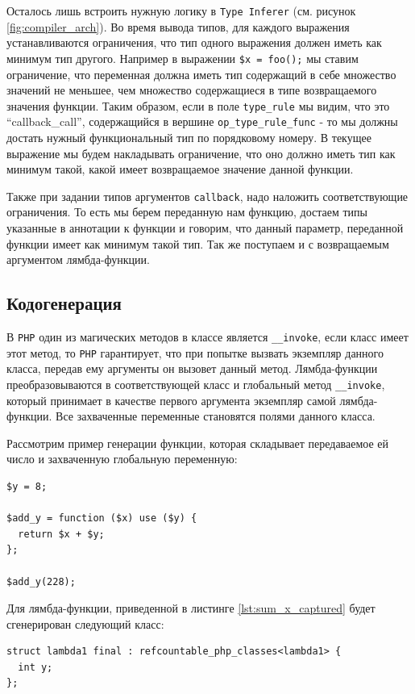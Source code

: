 Осталось лишь встроить нужную логику в \verb|Type Inferer| (см. рисунок \ref{fig:compiler_arch}).
Во время вывода типов, для каждого выражения устанавливаются ограничения, что тип одного выражения должен иметь как минимум тип другого.
Например в выражении \verb|$x = foo();| мы ставим ограничение, что переменная должна иметь тип содержащий в себе множество значений не меньшее, чем множество содержащиеся в типе возвращаемого значения функции.
Таким образом, если в поле \verb|type_rule| мы видим, что это ``callback\_call'', содержащийся в вершине \verb|op_type_rule_func| - то мы должны достать нужный функциональный тип по порядковому номеру.
В текущее выражение мы будем накладывать ограничение, что оно должно иметь тип как минимум такой, какой имеет возвращаемое значение данной функции.

Также при задании типов аргументов \verb|callback|, надо наложить соответствующие ограничения.
То есть мы берем переданную нам функцию, достаем типы указанные в аннотации к функции и говорим, что данный параметр, переданной функции имеет как минимум такой тип.
Так же поступаем и с возвращаемым аргументом лямбда-функции.

\subsection{Кодогенерация}
В \verb|PHP| один из магических методов в классе является \verb|__invoke|, если класс имеет этот метод, то \verb|PHP| гарантирует, что при попытке вызвать экземпляр данного класса, передав ему аргументы он вызовет данный метод.
Лямбда-функции преобразовываются в соответствующей класс и глобальный метод \verb|__invoke|, который принимает в качестве первого аргумента экземпляр самой лямбда-функции.
Все захваченные переменные становятся полями данного класса.

Рассмотрим пример генерации функции, которая складывает передаваемое ей число и захваченную глобальную переменную:
\begin{lstlisting}[label={lst:sum_x_captured},caption={Пример функции добавляющей к аргументу захваченное значение}]
$y = 8;

$add_y = function ($x) use ($y) {
  return $x + $y;
};

$add_y(228);
\end{lstlisting}

Для лямбда-функции, приведенной в листинге \ref{lst:sum_x_captured} будет сгенерирован следующий класс:
\begin{lstlisting}
struct lambda1 final : refcountable_php_classes<lambda1> {
  int y;
};
\end{lstlisting}

